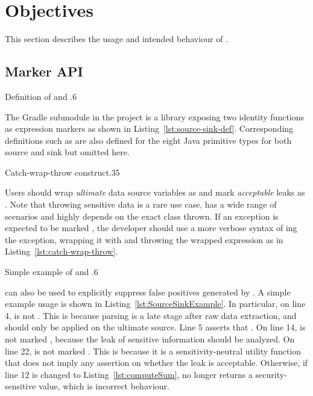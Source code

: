 \section{Objectives}\label{sec:objectives}
This section describes the usage and intended behaviour of \pname{}.

\subsection{Marker API}\label{subsec:marker-api}
{Definition of  and }{.6}

The  Gradle submodule in the project
is a library exposing two identity functions as expression markers
as shown in Listing~\ref{lst:source-sink-def}.
Corresponding definitions such as 
are also defined for the eight Java primitive types
for both source and sink but omitted here.

{Catch-wrap-throw construct}{.35}

Users should wrap \emph{ultimate} data source variables as 
and mark \emph{acceptable} leaks as .
Note that throwing sensitive data is a rare use case,
has a wide range of scenarios
and highly depends on the exact class thrown.
If an exception is expected to be marked ,
the developer should use a more verbose syntax of ing the exception,
wrapping it with  and throwing the wrapped expression
as in Listing~\ref{lst:catch-wrap-throw}.

{Simple example of  and }{.6}

 can also be used to explicitly suppress false positives generated by \pname{}.
A simple example usage is shown in Listing~\ref{lst:SourceSinkExample}.
In particular, on line 4,  is not .
This is because parsing is a late stage after raw data extraction,
and  should only be applied on the ultimate source.
Line 5 asserts that .
On line 14,  is not marked ,
because the leak of sensitive information should be analyzed.
On line 22,  is not marked .
This is because it is a sensitivity-neutral utility function
that does not imply any assertion on whether the leak is acceptable.
Otherwise, if line 12 is changed to Listing~\ref{lst:computeSum},
 no longer returns a security-sensitive value,
which is incorrect behaviour.

